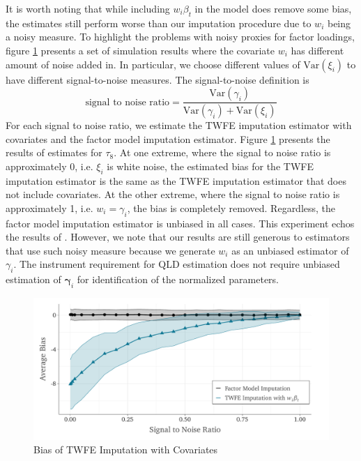 \documentclass[12pt]{article}
\begin{document}
It is worth noting that while including $w_i \beta_t$ in the model does remove some bias, the estimates still perform worse than our imputation procedure due to $w_i$ being a noisy measure. To highlight the problems with noisy proxies for factor loadings, figure \ref{fig:noisy_w} presents a set of simulation results where the covariate $w_i$ has different amount of noise added in. In particular, we choose different values of $\text{Var}(\xi_i)$ to have different signal-to-noise measures. The signal-to-noise definition is 
\begin{equation}
    \text{signal to noise ratio} = \frac{\text{Var}(\gamma_i)}{\text{Var}(\gamma_i) + \text{Var}(\xi_i)}
\end{equation}
For each signal to noise ratio, we estimate the TWFE imputation estimator with covariates and the factor model imputation estimator. Figure \ref{fig:noisy_w} presents the results of estimates for $\tau_8$. At one extreme, where the signal to noise ratio is approximately 0, i.e. $\xi_i$ is white noise, the estimated bias for the TWFE imputation estimator is the same as the TWFE imputation estimator that does not include covariates. At the other extreme, where the signal to noise ratio is approximately 1, i.e. $w_i = \gamma_i$, the bias is completely removed. Regardless, the factor model imputation estimator is unbiased in all cases. This experiment echos the results of \citet{kejriwal2021efficacy}. However, we note that our results are still generous to estimators that use such noisy measure because we generate $w_i$ as an unbiased estimator of $\gamma_i$. The instrument requirement for QLD estimation does not require unbiased estimation of $\bm \gamma_i$ for identification of the normalized parameters.

\begin{figure}
\begin{adjustbox}{width=.8\textwidth, center}
  \includegraphics{../figures/simulation-bias_signal_to_noise.pdf}
\end{adjustbox}
\caption{Bias of TWFE Imputation with Covariates}\label{fig:noisy_w}
\end{figure}
\end{document}
